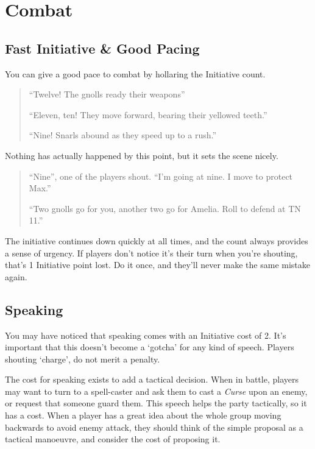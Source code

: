\section{Combat}

\begin{multicols}{2}

\subsection{Fast Initiative \& Good Pacing}

You can give a good pace to combat by hollaring the Initiative count.

\begin{quote}

``Twelve! The gnolls ready their weapons''

``Eleven, ten! They move forward, bearing their yellowed teeth.''

``Nine! Snarls abound as they speed up to a rush.''

\end{quote}

Nothing has actually happened by this point, but it sets the scene nicely.

\begin{quote}

``Nine'', one of the players shout.  ``I'm going at nine.  I move to protect Max.''

``Two gnolls go for you, another two go for Amelia.  Roll to defend at TN 11.''

\end{quote}

The initiative continues down quickly at all times, and the count always provides a sense of urgency.
If players don't notice it's their turn when you're shouting, that's 1 Initiative point lost.
Do it once, and they'll never make the same mistake again.

\subsection{Speaking}

You may have noticed that speaking comes with an Initiative cost of 2.
It's important that this doesn't become a `gotcha' for any kind of speech.
Players shouting `charge', do not merit a penalty.

The cost for speaking exists to add a tactical decision.
When in battle, players may want to turn to a spell-caster and ask them to cast a \textit{Curse} upon an enemy, or request that someone guard them.
This speech helps the party tactically, so it has a cost.
When a player has a great idea about the whole group moving backwards to avoid enemy attack, they should think of the simple proposal as a tactical manoeuvre, and consider the cost of proposing it.


\end{multicols}
